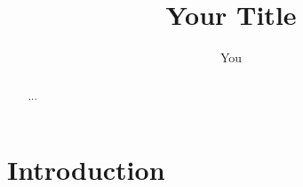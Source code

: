 \documentclass[11pt]{article}
\title{Your Title}
\author{You}
\begin{document}
\maketitle

\begin{abstract}
...
\end{abstract}

\section{Introduction}
\end{document}
